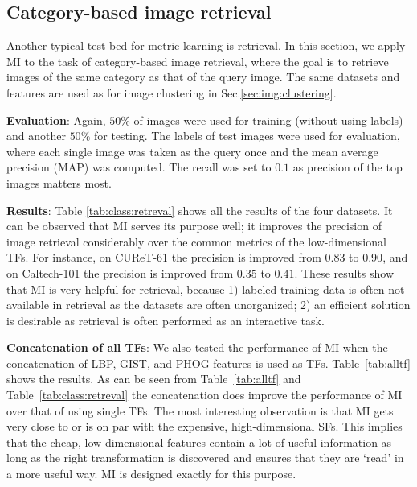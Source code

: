 
\subsection{Category-based image retrieval}

Another typical test-bed for metric learning is retrieval. In this
section, we apply MI to the task of category-based image retrieval,
where the goal is to retrieve images of the same category as that 
of the query image. The same datasets and features are used as for
image clustering in Sec.\ref{sec:img:clustering}.

\textbf{Evaluation}: Again, $50\%$ of images were used for training
(without using labels) and another $50\%$ for testing. The labels of
test images were used for evaluation, where each single image was
taken as the query once and the mean average precision (MAP) was
computed. The recall was set to $0.1$ as precision of the top images
matters most.


\textbf{Results}: Table \ref{tab:class:retreval} shows all the results
of the four datasets. It can be observed that MI
serves its purpose well; it improves the precision of image retrieval
considerably over the common metrics of the low-dimensional TFs. 
For instance, on CUReT-61 the precision is improved from
$0.83$ to $0.90$, and on Caltech-101 the precision is improved from
$0.35$ to $0.41$.  These results show that MI is very helpful for
retrieval, because 1) labeled training data is often not available in
retrieval as the datasets are often unorganized; 2) an efficient
solution is desirable as retrieval is often performed as an interactive
task.

\textbf{Concatenation of all TFs}: We also tested the performance of
MI when the concatenation of LBP, GIST, and PHOG features is used as 
TFs. Table~\ref{tab:alltf} shows the results. As can be seen from
Table~\ref{tab:alltf} and Table~\ref{tab:class:retreval} the 
concatenation does improve the performance of MI over that of using 
single TFs. The most interesting observation is that MI gets very close
to or is on par with the expensive, high-dimensional SFs. This implies
that the cheap, low-dimensional features contain a lot of useful
information as long as the right transformation is discovered and
ensures that they are `read' in a more useful way. MI is designed 
exactly for this purpose. 


